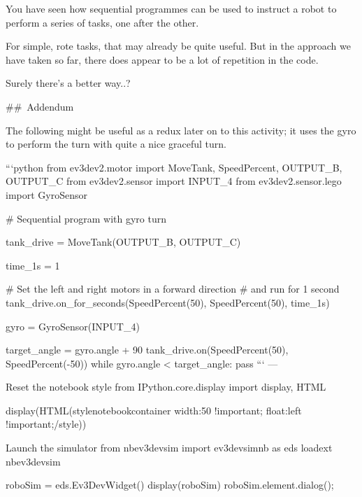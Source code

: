 \documentclass[letterpaper,10pt,english]{sphinxmanual}
\begin{document}
{You have seen how sequential programmes can be used to instruct a robot to perform a series of tasks, one after the other.

For simple, rote tasks, that may already be quite useful. But in the approach we have taken so far, there does appear to be a lot of repetition in the code.

Surely there's a better way..?


## Addendum

The following might be useful as a redux later on to this activity; it uses the gyro to perform the turn with quite a nice graceful turn.

```python
from ev3dev2.motor import MoveTank, SpeedPercent, OUTPUT_B, OUTPUT_C
from ev3dev2.sensor import INPUT_4
from ev3dev2.sensor.lego import GyroSensor

# Sequential program with gyro turn

tank_drive = MoveTank(OUTPUT_B, OUTPUT_C)

time_1s = 1

# Set the left and right motors in a forward direction
# and run for 1 second
tank_drive.on_for_seconds(SpeedPercent(50), SpeedPercent(50), time_1s)


gyro = GyroSensor(INPUT_4)

target_angle = gyro.angle + 90
tank_drive.on(SpeedPercent(50), SpeedPercent(-50))
while gyro.angle < target_angle:
    pass
```
---

{
\begin{sphinxVerbatim}[commandchars=\\\{\}]
\llap{\color{nbsphinxin}[ ]:\,\hspace{\fboxrule}\hspace{\fboxsep}}\PYGZsh{} Reset the notebook style
from IPython.core.display import display, HTML

display(HTML(\PYGZdq{}\PYGZlt{}style\PYGZgt{}\PYGZsh{}notebook\PYGZhy{}container \PYGZob{} width:50\PYGZpc{} !important; float:left !important;\PYGZcb{}\PYGZlt{}/style\PYGZgt{}\PYGZdq{}))


\PYGZsh{}Launch the simulator
from nbev3devsim import ev3devsim\PYGZus{}nb as eds
\PYGZpc{}load\PYGZus{}ext nbev3devsim

roboSim = eds.Ev3DevWidget()
display(roboSim)
roboSim.element.dialog();
\end{sphinxVerbatim}
}


}
\end{document}
